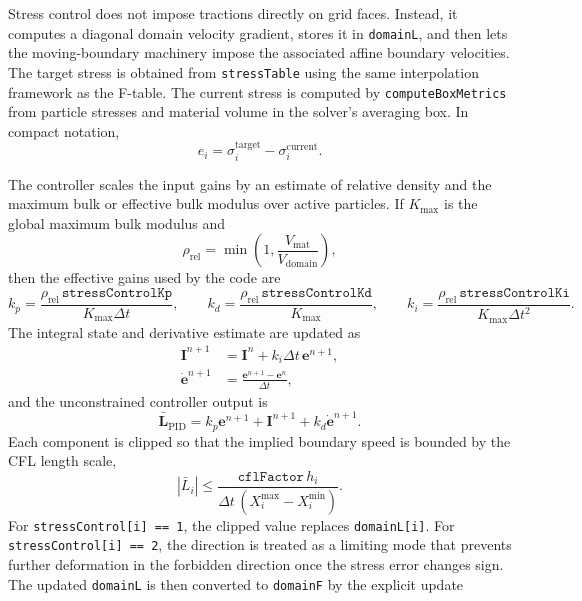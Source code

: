 Stress control does not impose tractions directly on grid faces.  Instead, it computes a diagonal domain velocity gradient, stores it in \texttt{domainL}, and then lets the moving-boundary machinery impose the associated affine boundary velocities.  The target stress is obtained from \texttt{stressTable} using the same interpolation framework as the F-table.  The current stress is computed by \texttt{computeBoxMetrics} from particle stresses and material volume in the solver's averaging box.  In compact notation,
\begin{equation}
  e_i = \sigma_i^{\mathrm{target}}-\sigma_i^{\mathrm{current}}.
  \label{eq:bc-stress-control-error}
\end{equation}

The controller scales the input gains by an estimate of relative density and the maximum bulk or effective bulk modulus over active particles.  If $K_{\max}$ is the global maximum bulk modulus and
\begin{equation}
  \rho_{\mathrm{rel}}=\min\left(1,\frac{V_{\mathrm{mat}}}{V_{\mathrm{domain}}}\right),
\end{equation}
then the effective gains used by the code are
\begin{equation}
  k_p=\frac{\rho_{\mathrm{rel}}\,\texttt{stressControlKp}}{K_{\max}\Delta t},
  \qquad
  k_d=\frac{\rho_{\mathrm{rel}}\,\texttt{stressControlKd}}{K_{\max}},
  \qquad
  k_i=\frac{\rho_{\mathrm{rel}}\,\texttt{stressControlKi}}{K_{\max}\Delta t^2}.
  \label{eq:bc-stress-control-scaled-gains}
\end{equation}
The integral state and derivative estimate are updated as
\begin{align}
  \mathbf{I}^{n+1} &= \mathbf{I}^{n}+k_i\Delta t\,\mathbf{e}^{n+1},\\
  \dot{\mathbf{e}}^{n+1} &= \frac{\mathbf{e}^{n+1}-\mathbf{e}^{n}}{\Delta t},
\end{align}
and the unconstrained controller output is
\begin{equation}
  \bar{\mathbf{L}}_{\mathrm{PID}} = k_p\mathbf{e}^{n+1}+\mathbf{I}^{n+1}+k_d\dot{\mathbf{e}}^{n+1}.
  \label{eq:bc-stress-control-pid}
\end{equation}
Each component is clipped so that the implied boundary speed is bounded by the CFL length scale,
\begin{equation}
  |\bar L_i| \le \frac{\texttt{cflFactor}\,h_i}{\Delta t\,(X_i^{\max}-X_i^{\min})}.
  \label{eq:bc-stress-control-cfl-limit}
\end{equation}
For \texttt{stressControl[i] == 1}, the clipped value replaces \texttt{domainL[i]}.  For \texttt{stressControl[i] == 2}, the direction is treated as a limiting mode that prevents further deformation in the forbidden direction once the stress error changes sign.  The updated \texttt{domainL} is then converted to \texttt{domainF} by the explicit update
